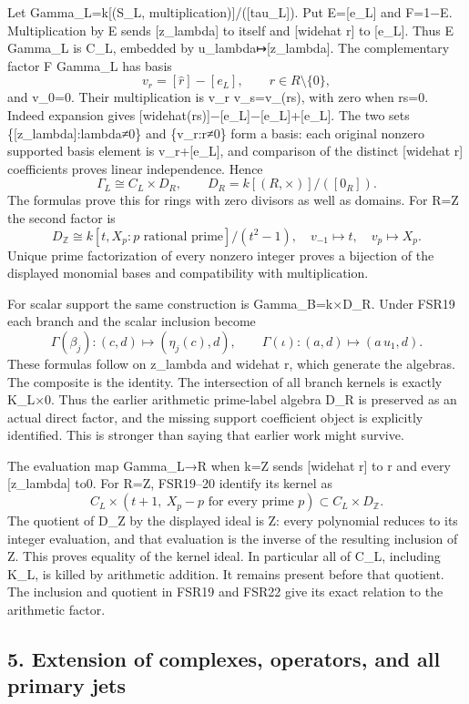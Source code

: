 \documentclass[
  10pt,
  a4paper,
]{article}
\begin{document}
Let Gamma\_L=k{[}(S\_L, multiplication){]}/({[}tau\_L{]}). Put
E={[}e\_L{]} and F=1−E. Multiplication by E sends {[}z\_lambda{]} to
itself and {[}widehat r{]} to {[}e\_L{]}. Thus E Gamma\_L is C\_L,
embedded by u\_lambda↦{[}z\_lambda{]}. The complementary factor F
Gamma\_L has basis \[
v_r=[\widehat r]-[e_L],\qquad r\in R\setminus\{0\},
\tag{FSR18}
\] and v\_0=0. Their multiplication is v\_r v\_s=v\_(rs), with zero when
rs=0. Indeed expansion gives
{[}widehat(rs){]}−{[}e\_L{]}−{[}e\_L{]}+{[}e\_L{]}. The two sets
\{{[}z\_lambda{]}:lambda≠0\} and \{v\_r:r≠0\} form a basis: each
original nonzero supported basis element is v\_r+{[}e\_L{]}, and
comparison of the distinct {[}widehat r{]} coefficients proves linear
independence. Hence \[
\Gamma_L\cong C_L\times D_R,
\qquad D_R=k[(R,\times)]/([0_R]).
\tag{FSR19}
\] The formulas prove this for rings with zero divisors as well as
domains. For R=Z the second factor is \[
D_{\mathbb Z}\cong k[t,X_p:p\text{ rational prime}]/(t^2-1),
\quad v_{-1}\mapsto t,\quad v_p\mapsto X_p.
\tag{FSR20}
\] Unique prime factorization of every nonzero integer proves a
bijection of the displayed monomial bases and compatibility with
multiplication.

For scalar support the same construction is Gamma\_B=k×D\_R. Under FSR19
each branch and the scalar inclusion become \[
\Gamma(\beta_j):(c,d)\longmapsto(\eta_j(c),d),
\qquad
\Gamma(\iota):(a,d)\longmapsto(a\,u_1,d).
\tag{FSR21}
\] These formulas follow on z\_lambda and widehat r, which generate the
algebras. The composite is the identity. The intersection of all branch
kernels is exactly K\_L×0. Thus the earlier arithmetic prime-label
algebra D\_R is preserved as an actual direct factor, and the missing
support coefficient object is explicitly identified. This is stronger
than saying that earlier work might survive.

The evaluation map Gamma\_L→R when k=Z sends {[}widehat r{]} to r and
every {[}z\_lambda{]} to0. For R=Z, FSR19--20 identify its kernel as \[
C_L\times (t+1,\ X_p-p\text{ for every prime }p)\subset C_L\times D_{\mathbb Z}.
\tag{FSR22}
\] The quotient of D\_Z by the displayed ideal is Z: every polynomial
reduces to its integer evaluation, and that evaluation is the inverse of
the resulting inclusion of Z. This proves equality of the kernel ideal.
In particular all of C\_L, including K\_L, is killed by arithmetic
addition. It remains present before that quotient. The inclusion and
quotient in FSR19 and FSR22 give its exact relation to the arithmetic
factor.

\subsection{5. Extension of complexes, operators, and all primary
jets}\label{extension-of-complexes-operators-and-all-primary-jets}
\end{document}
